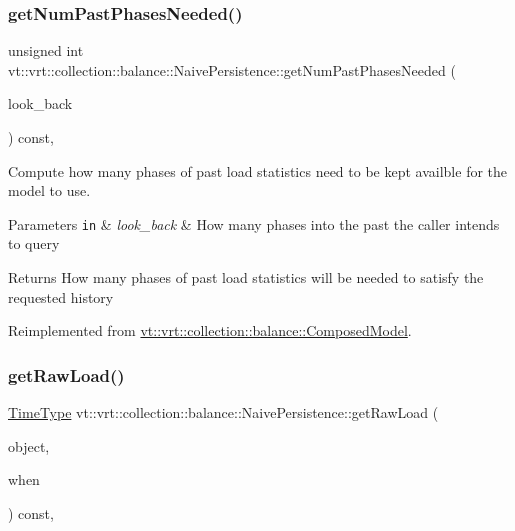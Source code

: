\subsubsection{\texorpdfstring{get\+Num\+Past\+Phases\+Needed()}{getNumPastPhasesNeeded()}}
{\footnotesize\ttfamily unsigned int vt\+::vrt\+::collection\+::balance\+::\+Naive\+Persistence\+::get\+Num\+Past\+Phases\+Needed (\begin{DoxyParamCaption}\item[{unsigned int}]{look\+\_\+back }\end{DoxyParamCaption}) const\hspace{0.3cm}{\ttfamily [override]}, {\ttfamily [virtual]}}



Compute how many phases of past load statistics need to be kept availble for the model to use. 


\begin{DoxyParams}[1]{Parameters}
\mbox{\tt in}  & {\em look\+\_\+back} & How many phases into the past the caller intends to query\\
\hline
\end{DoxyParams}
\begin{DoxyReturn}{Returns}
How many phases of past load statistics will be needed to satisfy the requested history 
\end{DoxyReturn}


Reimplemented from \hyperlink{classvt_1_1vrt_1_1collection_1_1balance_1_1_composed_model_a20bb994d1b3b27eb2a82729d7d5c30f3}{vt\+::vrt\+::collection\+::balance\+::\+Composed\+Model}.

\mbox{\label{structvt_1_1vrt_1_1collection_1_1balance_1_1_naive_persistence_aa339c8448a59cf522577f573fd5ed95c}} 
\subsubsection{\texorpdfstring{get\+Raw\+Load()}{getRawLoad()}}
{\footnotesize\ttfamily \hyperlink{namespacevt_a876a9d0cd5a952859c72de8a46881442}{Time\+Type} vt\+::vrt\+::collection\+::balance\+::\+Naive\+Persistence\+::get\+Raw\+Load (\begin{DoxyParamCaption}\item[{\hyperlink{namespacevt_1_1vrt_1_1collection_1_1balance_a9f5b53fafb270212279a4757d2c4cd28}{Element\+I\+D\+Struct}}]{object,  }\item[{\hyperlink{structvt_1_1vrt_1_1collection_1_1balance_1_1_phase_offset}{Phase\+Offset}}]{when }\end{DoxyParamCaption}) const\hspace{0.3cm}{\ttfamily [override]}, {\ttfamily [virtual]}}



